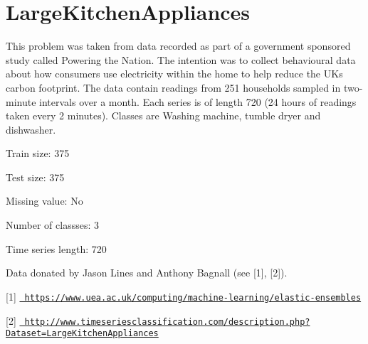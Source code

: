 \chapter{Large\+Kitchen\+Appliances}
\hypertarget{md_external_2data_2UCRArchive__2018_2LargeKitchenAppliances_2README}{}\label{md_external_2data_2UCRArchive__2018_2LargeKitchenAppliances_2README}
\label{md_external_2data_2UCRArchive__2018_2LargeKitchenAppliances_2README_autotoc_md133}%
%
 This problem was taken from data recorded as part of a government sponsored study called Powering the Nation. The intention was to collect behavioural data about how consumers use electricity within the home to help reduce the UK\textquotesingle{}s carbon footprint. The data contain readings from 251 households sampled in two-\/minute intervals over a month. Each series is of length 720 (24 hours of readings taken every 2 minutes). Classes are Washing machine, tumble dryer and dishwasher.

Train size\+: 375

Test size\+: 375

Missing value\+: No

Number of classses\+: 3

Time series length\+: 720

Data donated by Jason Lines and Anthony Bagnall (see \mbox{[}1\mbox{]}, \mbox{[}2\mbox{]}).

\mbox{[}1\mbox{]} \href{https://www.uea.ac.uk/computing/machine-learning/elastic-ensembles}{\texttt{ https\+://www.\+uea.\+ac.\+uk/computing/machine-\/learning/elastic-\/ensembles}}

\mbox{[}2\mbox{]} \href{http://www.timeseriesclassification.com/description.php?Dataset=LargeKitchenAppliances}{\texttt{ http\+://www.\+timeseriesclassification.\+com/description.\+php?\+Dataset=\+Large\+Kitchen\+Appliances}} 
